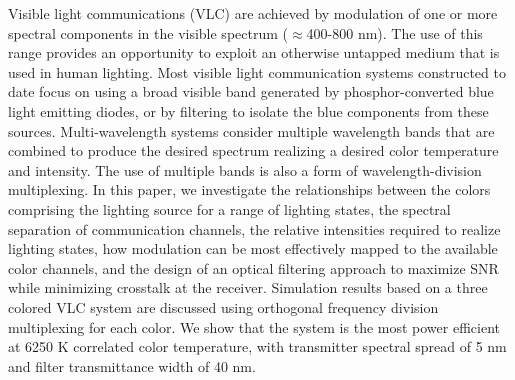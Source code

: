 Visible light communications (VLC) are achieved by modulation of one or more spectral components in the visible spectrum ($\approx$400-800 nm). The use of this range provides an opportunity to exploit an otherwise untapped medium that is used in human lighting. Most visible light communication systems constructed to date focus on using a broad visible band generated by phosphor-converted blue light emitting diodes, or by filtering to isolate the blue components from these sources. Multi-wavelength systems consider multiple wavelength bands that are combined to produce the desired spectrum realizing a desired color temperature and intensity. The use of multiple bands is also a form of wavelength-division multiplexing. In this paper, we investigate the relationships between the colors comprising the lighting source for a range of lighting states, the spectral separation of communication channels, the relative intensities required to realize lighting states, how modulation can be most effectively mapped to the available color channels, and the design of an optical filtering approach to maximize SNR while minimizing crosstalk at the receiver. Simulation results based on a three colored VLC system are discussed using orthogonal frequency division multiplexing for each color. We show that the system is the most power efficient at 6250 K correlated color temperature, with transmitter spectral spread of 5 nm and filter transmittance width of 40 nm.